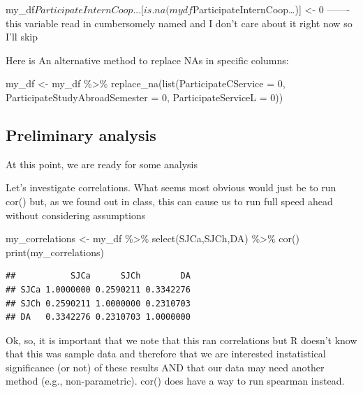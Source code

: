 \documentclass[
]{book}
\newenvironment{Shaded}{\begin{snugshade}}{\end{snugshade}}
\newcommand{\AttributeTok}[1]{\textcolor[rgb]{0.77,0.63,0.00}{#1}}
\newcommand{\DecValTok}[1]{\textcolor[rgb]{0.00,0.00,0.81}{#1}}
\newcommand{\FunctionTok}[1]{\textcolor[rgb]{0.00,0.00,0.00}{#1}}
\newcommand{\NormalTok}[1]{#1}
\newcommand{\OtherTok}[1]{\textcolor[rgb]{0.56,0.35,0.01}{#1}}
\newcommand{\SpecialCharTok}[1]{\textcolor[rgb]{0.00,0.00,0.00}{#1}}
\begin{document}
my\_df\(ParticipateInternCoop...[is.na(mydf\)ParticipateInternCoop\ldots){]} \textless- 0 ------- this variable read in cumbersomely named and I don't care about it right now so I'll skip

Here is An alternative method to replace NAs in specific columns:

\begin{Shaded}
\begin{Highlighting}[]
\NormalTok{my\_df }\OtherTok{\textless{}{-}}\NormalTok{ my\_df }\SpecialCharTok{\%\textgreater{}\%} 
  \FunctionTok{replace\_na}\NormalTok{(}\FunctionTok{list}\NormalTok{(}\AttributeTok{ParticipateCService =} \DecValTok{0}\NormalTok{, }\AttributeTok{ParticipateStudyAbroadSemester =} \DecValTok{0}\NormalTok{, }\AttributeTok{ParticipateServiceL =} \DecValTok{0}\NormalTok{))}
\end{Highlighting}
\end{Shaded}

\hypertarget{preliminary-analysis}{%
\subsection{Preliminary analysis}\label{preliminary-analysis}}

At this point, we are ready for some analysis

Let's investigate correlations. What seems most obvious would just be to run cor() but, as we found out in class, this can cause us to run full speed ahead without considering assumptions

\begin{Shaded}
\begin{Highlighting}[]
\NormalTok{my\_correlations }\OtherTok{\textless{}{-}}\NormalTok{ my\_df }\SpecialCharTok{\%\textgreater{}\%} \FunctionTok{select}\NormalTok{(SJCa,SJCh,DA) }\SpecialCharTok{\%\textgreater{}\%} \FunctionTok{cor}\NormalTok{()}
\FunctionTok{print}\NormalTok{(my\_correlations)}
\end{Highlighting}
\end{Shaded}

\begin{verbatim}
##           SJCa      SJCh        DA
## SJCa 1.0000000 0.2590211 0.3342276
## SJCh 0.2590211 1.0000000 0.2310703
## DA   0.3342276 0.2310703 1.0000000
\end{verbatim}

Ok, so, it is important that we note that this ran correlations but R doesn't know that this was sample data and therefore that we are interested instatistical significance (or not) of these results AND that our data may need another method (e.g., non-parametric). cor() does have a way to run spearman instead.
\end{document}
